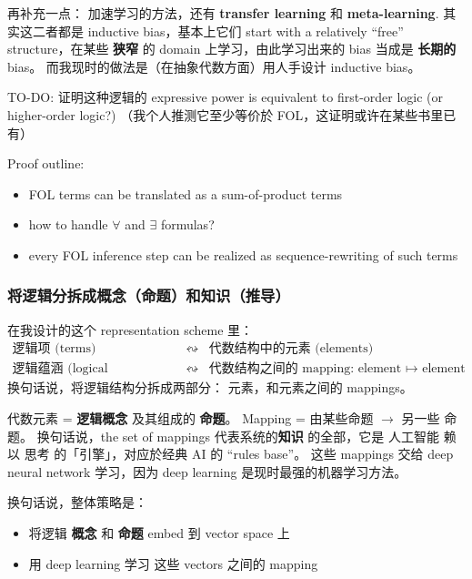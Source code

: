 \documentclass[orivec]{article}
\begin{document}
再补充一点： 加速学习的方法，还有 \textbf{transfer learning} 和 \textbf{meta-learning}.  其实这二者都是 inductive bias，基本上它们 start with a relatively ``free'' structure，在某些 \textbf{狭窄} 的 domain 上学习，由此学习出来的 bias 当成是 \textbf{长期的} bias。 而我现时的做法是（在抽象代数方面）用人手设计 inductive bias。

TO-DO:  证明这种逻辑的 expressive power is equivalent to first-order logic (or higher-order logic?)  （我个人推测它至少等价於 FOL，这证明或许在某些书里已有）

Proof outline:
\begin{itemize}
	\item FOL terms can be translated as a sum-of-product terms
	\item how to handle $\forall$ and $\exists$ formulas?
	\item every FOL inference step can be realized as sequence-rewriting of such terms
\end{itemize}

\subsubsection{将逻辑分拆成概念（命题）和知识（推导）}

在我设计的这个 representation scheme 里：
\begin{eqnarray}
\label{eqn:logic-knowledge-decomposition}
\mbox{逻辑项 (terms)} & \leftrightsquigarrow & \mbox{代数结构中的元素 (elements)} \nonumber \\
\mbox{逻辑蕴涵 (logical implication)} & \leftrightsquigarrow & \mbox{代数结构之间的 mapping: element $\mapsto$ element}
\end{eqnarray}
换句话说，将逻辑结构分拆成两部分： 元素，和元素之间的 mappings。 

代数元素 = \textbf{逻辑概念} 及其组成的 \textbf{命题}。  Mapping = 由某些命题 $\rightarrow$ 另一些 命题。  换句话说，the set of mappings 代表系统的\textbf{知识} 的全部，它是 人工智能 赖以 思考 的「引擎」，对应於经典 AI 的 ``rules base''。  这些 mappings 交给 deep neural network 学习，因为 deep learning 是现时最强的机器学习方法。 

换句话说，整体策略是：
\begin{itemize}
	\item 将逻辑 \textbf{概念} 和 \textbf{命题} embed 到 vector space 上
	\item 用 deep learning 学习 这些 vectors 之间的 mapping
\end{itemize}
\end{document}
